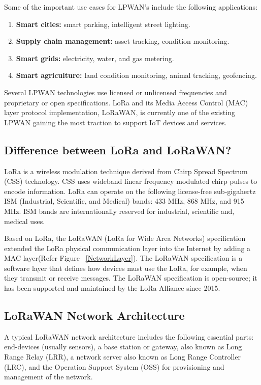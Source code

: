 Some of the important use cases for LPWAN's include the following applications:

\begin{enumerate}
	\item \textbf{Smart cities:} smart parking, intelligent street lighting.
	\item \textbf{Supply chain management:} asset tracking, condition monitoring.
	\item \textbf{Smart grids:} electricity, water, and gas metering.
	\item \textbf{Smart agriculture:} land condition monitoring, animal tracking, geofencing. \cite{ArduinoLoRaWAN101:2024}
\end{enumerate}

Several LPWAN technologies use licensed or unlicensed frequencies and proprietary or open specifications. LoRa and its Media Access Control (MAC) layer protocol implementation, LoRaWAN, is currently one of the existing LPWAN gaining the most traction to support IoT devices and services. 


\subsection{Difference between LoRa and LoRaWAN?} 
LoRa is a wireless modulation technique derived from Chirp Spread Spectrum (CSS) technology. CSS uses wideband linear frequency modulated chirp pulses to encode information. LoRa can operate on the following license-free sub-gigahertz ISM (Industrial, Scientific, and Medical) bands: 433 MHz, 868 MHz, and 915 MHz. ISM bands are internationally reserved for industrial, scientific and, medical uses. 
\newline

Based on LoRa, the LoRaWAN (LoRa for Wide Area Networks) specification extended the LoRa physical communication layer into the Internet by adding a MAC layer(Refer Figure ~\ref{NetworkLayer}). The LoRaWAN specification is a software layer that defines how devices must use the LoRa, for example, when they transmit or receive messages. The LoRaWAN specification is open-source; it has been supported and maintained by the LoRa Alliance since 2015. \cite{ArduinoLoRaWAN101:2024}

\subsection{LoRaWAN Network Architecture}

A typical LoRaWAN network architecture includes the following essential parts: end-devices (usually sensors), a base station or gateway, also known as Long Range Relay (LRR), a network server also known as Long Range Controller (LRC), and the Operation Support System (OSS) for provisioning and management of the network.
\cite{ArduinoLoRaWAN101:2024}


